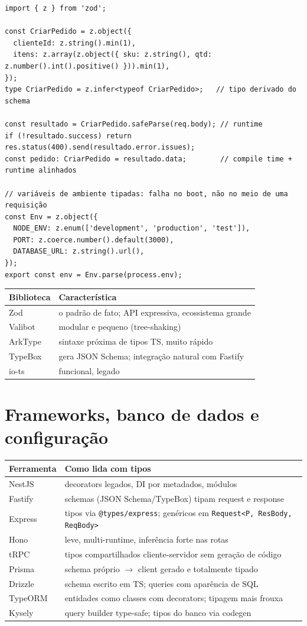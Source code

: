 \documentclass[12pt,a4paper,oneside]{book}
\newcommand{\code}[1]{\texttt{#1}}
\begin{document}
\begin{verbatim}
import { z } from 'zod';

const CriarPedido = z.object({
  clienteId: z.string().min(1),
  itens: z.array(z.object({ sku: z.string(), qtd: z.number().int().positive() })).min(1),
});
type CriarPedido = z.infer<typeof CriarPedido>;   // tipo derivado do schema

const resultado = CriarPedido.safeParse(req.body); // runtime
if (!resultado.success) return res.status(400).send(resultado.error.issues);
const pedido: CriarPedido = resultado.data;        // compile time + runtime alinhados

// variáveis de ambiente tipadas: falha no boot, não no meio de uma requisição
const Env = z.object({
  NODE_ENV: z.enum(['development', 'production', 'test']),
  PORT: z.coerce.number().default(3000),
  DATABASE_URL: z.string().url(),
});
export const env = Env.parse(process.env);
\end{verbatim}

{\small
\begin{tabularx}{\textwidth}{@{}lX@{}}
\toprule
\textbf{Biblioteca} & \textbf{Característica} \\
\midrule
Zod & o padrão de fato; API expressiva, ecossistema grande \\
Valibot & modular e pequeno (tree-shaking) \\
ArkType & sintaxe próxima de tipos TS, muito rápido \\
TypeBox & gera JSON Schema; integração natural com Fastify \\
io-ts & funcional, legado \\
\bottomrule
\end{tabularx}
}

\section{Frameworks, banco de dados e configuração}

{\small
\begin{tabularx}{\textwidth}{@{}lX@{}}
\toprule
\textbf{Ferramenta} & \textbf{Como lida com tipos} \\
\midrule
NestJS & decorators legados, DI por metadados, módulos \\
Fastify & schemas (JSON Schema/TypeBox) tipam request e response \\
Express & tipos via \code{@types/express}; genéricos em \code{Request<P, ResBody, ReqBody>} \\
Hono & leve, multi-runtime, inferência forte nas rotas \\
tRPC & tipos compartilhados cliente-servidor sem geração de código \\
\midrule
Prisma & schema próprio $\rightarrow$ client gerado e totalmente tipado \\
Drizzle & schema escrito em TS; queries com aparência de SQL \\
TypeORM & entidades como classes com decorators; tipagem mais frouxa \\
Kysely & query builder type-safe; tipos do banco via codegen \\
\bottomrule
\end{tabularx}
}
\end{document}
